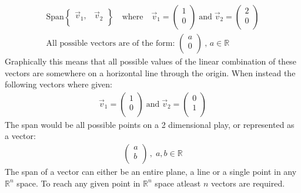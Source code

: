 \documentclass[11pt, a4paper]{article}
\begin{document}
\begin{align*}
    \text{Span} 
    \begin{Bmatrix}
        \vec{v}_1, & \vec{v}_2 \\
    \end{Bmatrix}
    \hspace{1em} \text{where} \hspace{1em} \vec{v}_1 =
    \begin{pmatrix}
        1\\
        0\\
    \end{pmatrix}
    \; \text{and} \; \vec{v}_2 = 
    \begin{pmatrix}
        2\\
        0\\
    \end{pmatrix}\\
    \text{All possible vectors are of the form: }
    \begin{pmatrix}
        a\\
        0\\
    \end{pmatrix}
    \: ,\, a \in \mathbb{R}
\end{align*}
Graphically this means that all possible values of the linear combination 
of these vectors are somewhere on a horizontal line through the origin.
When instead the following vectors where given:
\begin{align*}
    \vec{v}_1 =
    \begin{pmatrix}
        1\\
        0\\
    \end{pmatrix}
    \; \text{and} \; \vec{v}_2 =
    \begin{pmatrix}
        0\\
        1\\
    \end{pmatrix}
\end{align*}
The span would be all possible points on a 2 dimensional play, or represented as a vector:
\begin{align*}
    \begin{pmatrix}
        a\\
        b\\
    \end{pmatrix}
    \, , \; a, b \in \mathbb{R}
\end{align*}
The span of a vector can either be an entire plane, a line or a single point in any $\mathbb{R}^n$ space.
To reach any given point in $\mathbb{R}^n$ space atleast $n$ vectors are required.
\end{document}
